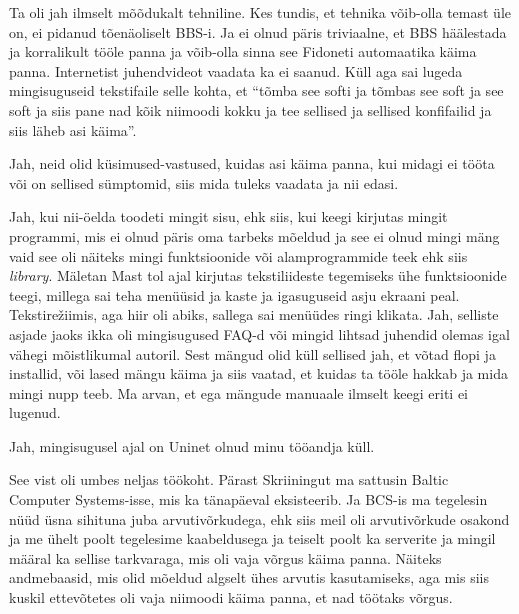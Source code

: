 
Ta oli jah ilmselt mõõdukalt tehniline. Kes tundis, et tehnika võib-olla temast üle on, ei pidanud tõenäoliselt BBS-i. Ja ei olnud päris triviaalne, et BBS häälestada ja korralikult tööle panna ja võib-olla sinna see Fidoneti automaatika käima panna. Internetist juhendvideot vaadata ka ei saanud. Küll aga sai lugeda mingisuguseid tekstifaile  selle kohta, et \enquote{tõmba see softi ja tõmbas see soft ja see soft ja siis pane nad kõik niimoodi kokku ja  tee sellised ja sellised konfifailid ja siis läheb asi käima}.


Jah, neid  olid küsimused-vastused, kuidas asi käima panna, kui midagi ei tööta või on sellised sümptomid, siis mida tuleks vaadata ja nii edasi.


Jah, kui nii-öelda toodeti mingit sisu, ehk siis, kui keegi kirjutas mingit programmi, mis ei olnud  päris oma tarbeks mõeldud ja see ei olnud mingi mäng vaid see oli näiteks mingi funktsioonide või alamprogrammide teek ehk siis \emph{library}. Mäletan Mast tol ajal kirjutas tekstiliideste tegemiseks ühe funktsioonide teegi, millega sai teha menüüsid ja kaste ja igasuguseid asju ekraani peal. Tekstirežiimis, aga hiir oli  abiks, sallega sai menüüdes ringi klikata. Jah, selliste asjade jaoks ikka oli mingisugused FAQ-d või mingid lihtsad juhendid olemas igal vähegi mõistlikumal autoril. Sest mängud olid küll sellised jah, et võtad flopi ja installid, või lased mängu käima ja siis vaatad, et kuidas ta tööle hakkab ja mida mingi nupp teeb. Ma arvan, et ega mängude manuaale ilmselt keegi eriti ei lugenud.


Jah, mingisugusel ajal on Uninet  olnud minu tööandja küll.


See vist oli umbes neljas töökoht. Pärast Skriiningut ma sattusin Baltic Computer Systems-isse, mis ka tänapäeval eksisteerib. Ja BCS-is ma tegelesin  nüüd üsna sihituna juba arvutivõrkudega, ehk siis meil oli arvutivõrkude osakond ja me  ühelt poolt tegelesime kaabeldusega ja teiselt poolt  ka serverite ja mingil määral ka sellise tarkvaraga, mis  oli vaja võrgus käima panna. Näiteks andmebaasid, mis olid mõeldud algselt ühes arvutis kasutamiseks, aga mis siis kuskil ettevõtetes oli vaja niimoodi käima panna, et nad töötaks võrgus. 

